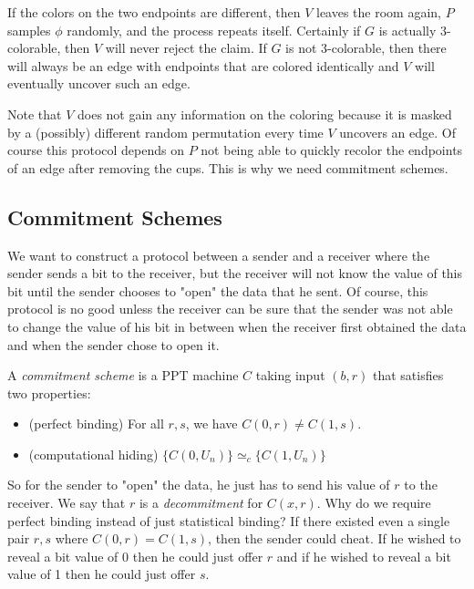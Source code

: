 If the colors on the two endpoints are different, then $V$ leaves the room again, $P$ samples $\phi$ randomly, and the process repeats itself. Certainly if $G$ is actually 3-colorable, then $V$ will never reject the claim. If $G$ is not 3-colorable, then there will always be an edge with endpoints that are colored identically and $V$ will eventually uncover such an edge.

Note that $V$ does not gain any information on the coloring because it is masked by a (possibly) different random permutation every time $V$ uncovers an edge. Of course this protocol depends on $P$ not being able to quickly recolor the endpoints of an edge after removing the cups. This is why we need commitment schemes.

\subsection{Commitment Schemes}

We want to construct a protocol between a sender and a receiver where the sender sends a bit to the receiver, but the receiver will not know the value of this bit until the sender chooses to "open" the data that he sent. Of course, this protocol is no good unless the receiver can be sure that the sender was not able to change the value of his bit in between when the receiver first obtained the data and when the sender chose to open it.

\begin{definition}
A \emph{commitment scheme} is a PPT machine $C$ taking input $(b,r)$ that satisfies two properties: \begin{itemize}
\item (perfect binding) For all $r, s$, we have $C(0,r) \neq C(1,s)$.

\item (computational hiding) $\{ C(0, U_n) \} \simeq_c \{ C(1, U_n) \}$

\end{itemize}
\end{definition}

So for the sender to "open" the data, he just has to send his value of $r$ to the receiver. We say that $r$ is a \emph{decommitment} for $C(x,r)$. Why do we require perfect binding instead of just statistical binding? If there existed even a single pair $r, s$ where $C(0,r) = C(1,s)$, then the sender could cheat. If he wished to reveal a bit value of 0 then he could just offer $r$ and if he wished to reveal a bit value of 1 then he could just offer $s$.

